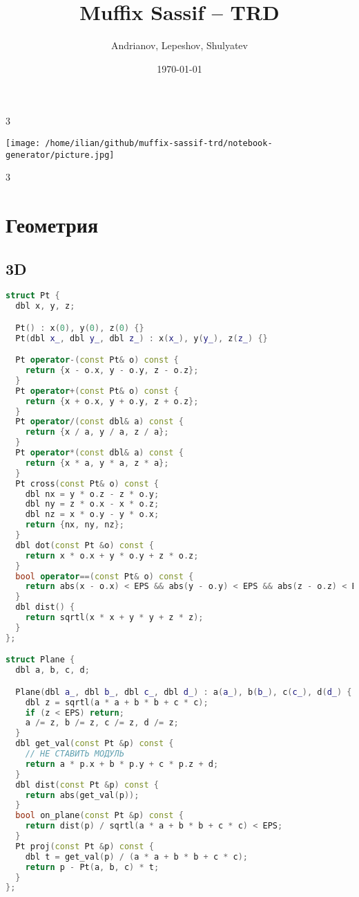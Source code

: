 \documentclass[9pt,a4paper,landscape,twosided]{extarticle}
\begin{document}
\title{\bf{Muffix Sassif -- TRD}}
\author{Andrianov, Lepeshov, Shulyatev}
\date{\today}
\maketitle
\begin{multicols*}{3}
\begin{center}\texttt{[image: /home/ilian/github/muffix-sassif-trd/notebook-generator/picture.jpg]}\end{center}
\tableofcontents
\end{multicols*}
\pagebreak
\begin{multicols*}{3}


\section{Геометрия}

\subsection{3D}
\begin{lstlisting}[language=C++]
struct Pt {
  dbl x, y, z;

  Pt() : x(0), y(0), z(0) {}
  Pt(dbl x_, dbl y_, dbl z_) : x(x_), y(y_), z(z_) {}

  Pt operator-(const Pt& o) const {
    return {x - o.x, y - o.y, z - o.z};
  }
  Pt operator+(const Pt& o) const {
    return {x + o.x, y + o.y, z + o.z};
  }
  Pt operator/(const dbl& a) const {
    return {x / a, y / a, z / a};
  }
  Pt operator*(const dbl& a) const {
    return {x * a, y * a, z * a};
  }
  Pt cross(const Pt& o) const {
    dbl nx = y * o.z - z * o.y;
    dbl ny = z * o.x - x * o.z;
    dbl nz = x * o.y - y * o.x;
    return {nx, ny, nz};
  }
  dbl dot(const Pt &o) const {
    return x * o.x + y * o.y + z * o.z;
  }
  bool operator==(const Pt& o) const {
    return abs(x - o.x) < EPS && abs(y - o.y) < EPS && abs(z - o.z) < EPS;
  }
  dbl dist() {
    return sqrtl(x * x + y * y + z * z);
  }
};

struct Plane {
  dbl a, b, c, d;

  Plane(dbl a_, dbl b_, dbl c_, dbl d_) : a(a_), b(b_), c(c_), d(d_) {
    dbl z = sqrtl(a * a + b * b + c * c);
    if (z < EPS) return;
    a /= z, b /= z, c /= z, d /= z;
  }
  dbl get_val(const Pt &p) const {
    // НЕ СТАВИТЬ МОДУЛЬ
    return a * p.x + b * p.y + c * p.z + d;
  }
  dbl dist(const Pt &p) const {
    return abs(get_val(p));
  }
  bool on_plane(const Pt &p) const {
    return dist(p) / sqrtl(a * a + b * b + c * c) < EPS;
  }
  Pt proj(const Pt &p) const {
    dbl t = get_val(p) / (a * a + b * b + c * c);
    return p - Pt(a, b, c) * t;
  }
};


\end{lstlisting}
\end{multicols*}
\end{document}
